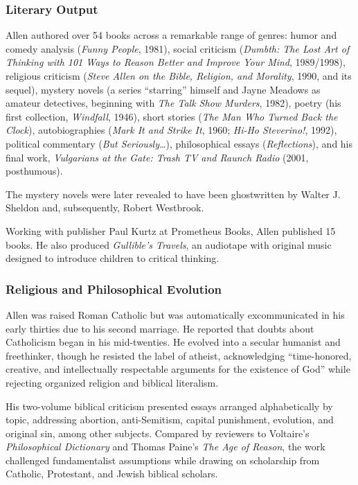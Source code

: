 \documentclass[11pt,letterpaper]{article}
\begin{document}
\subsubsection{Literary Output}

Allen authored over 54 books across a remarkable range of genres: humor and comedy analysis (\textit{Funny People}, 1981), social criticism (\textit{Dumbth: The Lost Art of Thinking with 101 Ways to Reason Better and Improve Your Mind}, 1989/1998), religious criticism (\textit{Steve Allen on the Bible, Religion, and Morality}, 1990, and its sequel), mystery novels (a series ``starring'' himself and Jayne Meadows as amateur detectives, beginning with \textit{The Talk Show Murders}, 1982), poetry (his first collection, \textit{Windfall}, 1946), short stories (\textit{The Man Who Turned Back the Clock}), autobiographies (\textit{Mark It and Strike It}, 1960; \textit{Hi-Ho Steverino!}, 1992), political commentary (\textit{But Seriously\ldots}), philosophical essays (\textit{Reflections}), and his final work, \textit{Vulgarians at the Gate: Trash TV and Raunch Radio} (2001, posthumous).

The mystery novels were later revealed to have been ghostwritten by Walter J. Sheldon and, subsequently, Robert Westbrook.

Working with publisher Paul Kurtz at Prometheus Books, Allen published 15 books. He also produced \textit{Gullible's Travels}, an audiotape with original music designed to introduce children to critical thinking.

\subsubsection{Religious and Philosophical Evolution}

Allen was raised Roman Catholic but was automatically excommunicated in his early thirties due to his second marriage. He reported that doubts about Catholicism began in his mid-twenties. He evolved into a secular humanist and freethinker, though he resisted the label of atheist, acknowledging ``time-honored, creative, and intellectually respectable arguments for the existence of God'' while rejecting organized religion and biblical literalism.

His two-volume biblical criticism presented essays arranged alphabetically by topic, addressing abortion, anti-Semitism, capital punishment, evolution, and original sin, among other subjects. Compared by reviewers to Voltaire's \textit{Philosophical Dictionary} and Thomas Paine's \textit{The Age of Reason}, the work challenged fundamentalist assumptions while drawing on scholarship from Catholic, Protestant, and Jewish biblical scholars.
\end{document}
